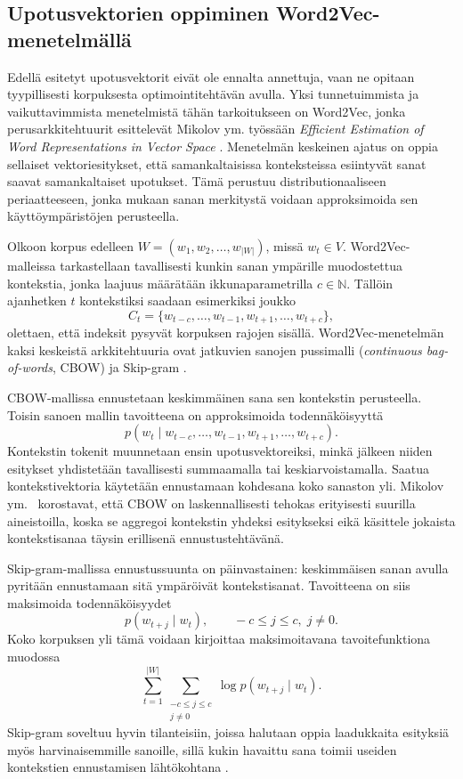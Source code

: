 \subsection{Upotusvektorien oppiminen Word2Vec-menetelmällä}

Edellä esitetyt upotusvektorit eivät ole ennalta annettuja, vaan ne opitaan
tyypillisesti korpuksesta optimointitehtävän avulla. Yksi tunnetuimmista ja
vaikuttavimmista menetelmistä tähän tarkoitukseen on Word2Vec, jonka
perusarkkitehtuurit esittelevät Mikolov ym. työssään
\emph{Efficient Estimation of Word Representations in Vector Space}
\cite{mikolov2013efficient}. Menetelmän keskeinen ajatus on oppia sellaiset
vektoriesitykset, että samankaltaisissa konteksteissa esiintyvät sanat saavat
samankaltaiset upotukset. Tämä perustuu distributionaaliseen periaatteeseen,
jonka mukaan sanan merkitystä voidaan approksimoida sen käyttöympäristöjen
perusteella.

Olkoon korpus edelleen \(W = (w_1, w_2, \dots, w_{|W|})\), missä
\(w_t \in V\). Word2Vec-malleissa tarkastellaan tavallisesti kunkin sanan
ympärille muodostettua kontekstia, jonka laajuus määrätään ikkunaparametrilla
\(c \in \mathbb{N}\). Tällöin ajanhetken \(t\) kontekstiksi saadaan esimerkiksi
joukko
\[
  C_t = \{w_{t-c}, \dots, w_{t-1}, w_{t+1}, \dots, w_{t+c}\},
\]
olettaen, että indeksit pysyvät korpuksen rajojen sisällä. Word2Vec-menetelmän
kaksi keskeistä arkkitehtuuria ovat jatkuvien sanojen pussimalli
(\emph{continuous bag-of-words}, CBOW) ja Skip-gram
\cite{mikolov2013efficient}.

CBOW-mallissa ennustetaan keskimmäinen sana sen kontekstin perusteella. Toisin
sanoen mallin tavoitteena on approksimoida todennäköisyyttä
\[
  p(w_t \mid w_{t-c}, \dots, w_{t-1}, w_{t+1}, \dots, w_{t+c}).
\]
Kontekstin tokenit muunnetaan ensin upotusvektoreiksi, minkä jälkeen niiden
esitykset yhdistetään tavallisesti summaamalla tai keskiarvoistamalla. Saatua
kontekstivektoria käytetään ennustamaan kohdesana koko sanaston yli.
Mikolov ym.\ \cite{mikolov2013efficient} korostavat, että CBOW on
laskennallisesti tehokas erityisesti suurilla aineistoilla, koska se aggregoi
kontekstin yhdeksi esitykseksi eikä käsittele jokaista kontekstisanaa täysin
erillisenä ennustustehtävänä.

Skip-gram-mallissa ennustussuunta on päinvastainen: keskimmäisen sanan avulla
pyritään ennustamaan sitä ympäröivät kontekstisanat. Tavoitteena on siis
maksimoida todennäköisyydet
\[
  p(w_{t+j} \mid w_t),
  \qquad
  -c \le j \le c,\; j \ne 0.
\]
Koko korpuksen yli tämä voidaan kirjoittaa maksimoitavana tavoitefunktiona
muodossa
\[
  \sum_{t=1}^{|W|} \sum_{\substack{-c \le j \le c \\ j \ne 0}}
  \log p(w_{t+j} \mid w_t).
\]
Skip-gram soveltuu hyvin tilanteisiin, joissa halutaan oppia laadukkaita
esityksiä myös harvinaisemmille sanoille, sillä kukin havaittu sana toimii
useiden kontekstien ennustamisen lähtökohtana
\cite{mikolov2013efficient}.

